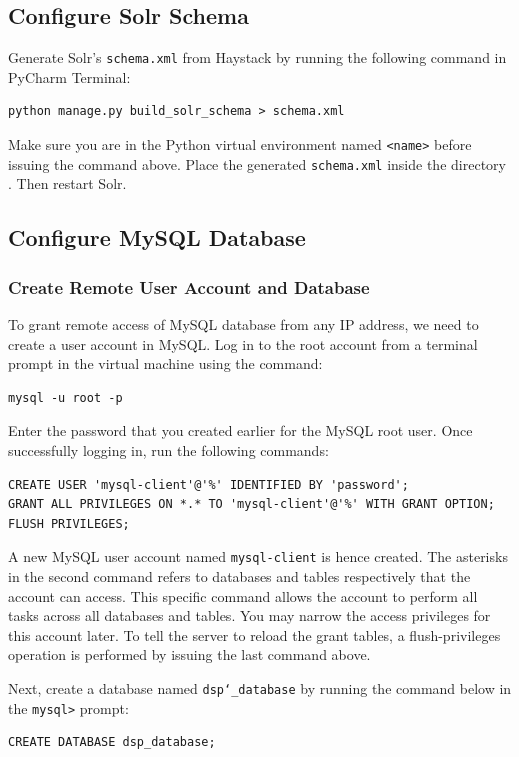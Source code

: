 \subsection{Configure Solr Schema}
Generate Solr's \texttt{schema.xml} from Haystack by running the following command in PyCharm Terminal:
\begin{verbatim}
python manage.py build_solr_schema > schema.xml
\end{verbatim}

Make sure you are in the Python virtual environment named \texttt{<name>} before issuing the command above. Place the generated \texttt{schema.xml} inside the directory . Then restart Solr.

\subsection{Configure MySQL Database}
\subsubsection{Create Remote User Account and Database}
To grant remote access of MySQL database from any IP address, we need to create a user account in MySQL. Log in to the root account from a terminal prompt in the virtual machine using the command:
\begin{verbatim}
mysql -u root -p
\end{verbatim}

Enter the password that you created earlier for the MySQL root user. Once successfully logging in, run the following commands:
\begin{verbatim}
CREATE USER 'mysql-client'@'%' IDENTIFIED BY 'password';
GRANT ALL PRIVILEGES ON *.* TO 'mysql-client'@'%' WITH GRANT OPTION;
FLUSH PRIVILEGES;
\end{verbatim}

A new MySQL user account named \texttt{mysql-client} is hence created. The asterisks in the second command refers to databases and tables respectively that the account can access. This specific command allows the account to perform all tasks across all databases and tables. You may narrow the access privileges for this account later. To tell the server to reload the grant tables, a flush-privileges operation is performed by issuing the last command above.

Next, create a database named \texttt{dsp\char`_database} by running the command below in the \texttt{mysql>} prompt:
\begin{verbatim}
CREATE DATABASE dsp_database;
\end{verbatim}

